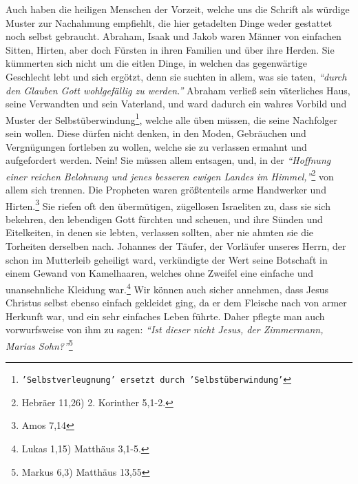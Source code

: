 Auch haben die heiligen Menschen der Vorzeit, welche uns die
Schrift als würdige
Muster zur Nachahmung empfiehlt, die hier getadelten Dinge weder gestattet noch
selbst gebraucht. Abraham, Isaak
und
Jakob waren Männer von einfachen Sitten,
Hirten, aber doch Fürsten in ihren Familien und über ihre Herden. Sie
kümmerten sich nicht um die eitlen Dinge, in welchen das gegenwärtige
Geschlecht lebt und sich ergötzt, denn sie suchten in allem, was sie taten,
\textit{"`durch den Glauben Gott wohlgefällig zu werden."'} Abraham verließ sein
väterliches Haus, seine Verwandten und sein Vaterland, und ward dadurch ein
wahres Vorbild und Muster der
Selbstüberwindung\footnote{\texttt{'Selbstverleugnung'
ersetzt durch 'Selbstüberwindung'}}, welche alle üben müssen, die
seine Nachfolger sein wollen. Diese dürfen nicht denken, in den Moden,
Gebräuchen und Vergnügungen fortleben zu wollen, welche sie zu verlassen
ermahnt und aufgefordert werden. Nein! Sie müssen allem
entsagen, und, in der
\textit{"`Hoffnung einer reichen Belohnung und jenes besseren ewigen Landes im
Himmel,"'}\footnote{Hebräer 11,26) 2. Korinther
5,1-2.}
von allem sich trennen. Die
Propheten waren größtenteils arme Handwerker und
Hirten.\footnote{Amos 7,14}
Sie riefen oft den übermütigen, zügellosen
Israeliten zu, dass sie
sich bekehren,
den lebendigen Gott fürchten und scheuen, und ihre
Sünden und Eitelkeiten, in
denen sie lebten, verlassen sollten, aber nie ahmten sie die Torheiten
derselben nach. Johannes der Täufer, der
Vorläufer unseres
Herrn, der schon im
Mutterleib geheiligt ward, verkündigte der Wert seine Botschaft
in einem
Gewand von Kamelhaaren, welches ohne Zweifel eine einfache und unansehnliche
Kleidung war.\footnote{Lukas 1,15) Matthäus
3,1-5.}
Wir können auch sicher annehmen,
dass Jesus Christus selbst ebenso einfach gekleidet ging, da er dem Fleische
nach von armer Herkunft war, und ein sehr einfaches
Leben
führte. Daher pflegte
man auch vorwurfsweise von ihm zu sagen:
\textit{"`Ist dieser nicht Jesus, der
Zimmermann, Marias Sohn?"'}\footnote{Markus 6,3) Matthäus 13,55}
